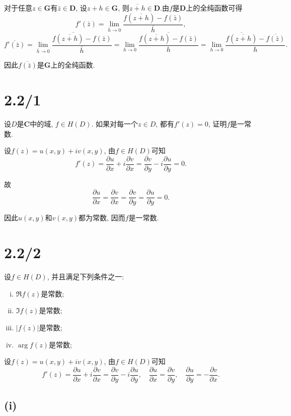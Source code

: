 \documentclass[11pt,a4paper]{article}
\begin{document}
对于任意$z\in\mathbf{G}$有$\bar{z}\in\mathbf{D}$, 设$z+h\in\mathbf{G}$, 则$\overline{z+h}\in\mathbf{D}$.由$f$是$\mathbf{D}$上的全纯函数可得
$$f'(\bar{z})=\lim_{\bar{h}\to0}\frac{f({\overline{z+h}})-f(\bar{z})}{\bar{h}},$$
$$\overline{f'(\bar{z})}=\overline{\lim_{\bar{h}\to0}\frac{f({\overline{z+h}})-f(\bar{z})}{\bar{h}}}=\lim_{h\to0}\frac{\overline{f(\overline{z+h})-f(\bar{z})}}{h}=\lim_{h\to0}\frac{\overline{f({\overline{z+h}})}-\overline{f(\bar{z})}}{h}.$$

因此$\overline{f(\bar{z})}$是$\mathbf{G}$上的全纯函数.

\section{2.2/1}
\begin{problem}
  设$D$是$\mathbf{C}$中的域, $f\in H(D)$. 如果对每一个$z\in D$, 都有$f'(z)=0$, 证明$f$是一常数.
\end{problem}

设$f(z)=u(x,y)+iv(x,y)$, 由$f\in H(D)$可知
$$f'(z)=\frac{\partial u}{\partial x}+i\frac{\partial v}{\partial x}=\frac{\partial v}{\partial y}-i\frac{\partial u}{\partial y}=0.$$

故
$$\frac{\partial u}{\partial x}=\frac{\partial v}{\partial x}=\frac{\partial v}{\partial y}=\frac{\partial u}{\partial y}=0.$$

因此$u(x,y)$和$v(x,y)$都为常数, 因而$f$是一常数.

\section{2.2/2}
\begin{problem}
设$f\in H(D)$, 并且满足下列条件之一:
\begin{enumerate}[(i)]
  \item $\Re f(z)$是常数;
  \item $\Im f(z)$是常数;
  \item $|f(z)|$是常数;
  \item $\arg f(z)$是常数;
\end{enumerate}
\end{problem}

设$f(z)=u(x,y)+iv(x,y)$, 由$f\in H(D)$可知
$$f'(z)=\frac{\partial u}{\partial x}+i\frac{\partial v}{\partial x}=\frac{\partial v}{\partial y}-i\frac{\partial u}{\partial y},\quad\frac{\partial u}{\partial x}=\frac{\partial v}{\partial y},\quad\frac{\partial u}{\partial y}=-\frac{\partial v}{\partial x}.$$

\subsection*{(i)}
\end{document}
